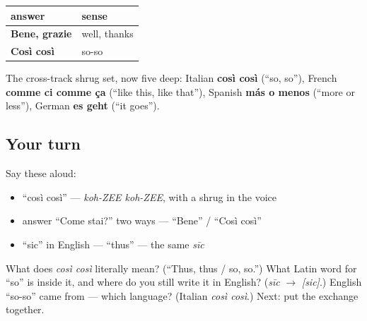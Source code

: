 \begin{grammarlens}[title={Grammar Lens: your answer ladder for \emph{Come stai?}}]
\noindent
\begin{tabularx}{\linewidth}{@{}>{\raggedright\arraybackslash}X>{\raggedright\arraybackslash}X@{}}
\toprule
\textbf{answer} & \textbf{sense} \\
\midrule
\textbf{Bene, grazie} & well, thanks \\
\textbf{Così così} & so-so \\
\bottomrule
\end{tabularx}

The cross-track shrug set, now five deep: Italian \textbf{così così} (\textquotedblleft{}so, so\textquotedblright{}), French \textbf{comme ci comme ça} (\textquotedblleft{}like this, like that\textquotedblright{}), Spanish \textbf{más o menos} (\textquotedblleft{}more or less\textquotedblright{}), German \textbf{es geht} (\textquotedblleft{}it goes\textquotedblright{}).
\end{grammarlens}

\subsection*{Your turn}
Say these aloud:

\begin{itemize}
\raggedright
  \item \textquotedblleft{}così così\textquotedblright{} — \emph{koh-ZEE koh-ZEE}, with a shrug in the voice
  \item answer \textquotedblleft{}Come stai?\textquotedblright{} two ways — \textquotedblleft{}Bene\textquotedblright{} / \textquotedblleft{}Così così\textquotedblright{}
  \item \textquotedblleft{}sic\textquotedblright{} in English — \textquotedblleft{}thus\textquotedblright{} — the same \emph{sīc}
\end{itemize}

\begin{tcolorbox}[breakable,colback=teal!4,colframe=teal!35!black,title={Before you move on}]
What does \emph{così così} literally mean? (\textquotedblleft{}Thus, thus / so, so.\textquotedblright{}) What Latin word for \textquotedblleft{}so\textquotedblright{} is inside it, and where do you still write it in English? (\emph{sīc} $\to$ \emph{{[}sic{]}}.) English \textquotedblleft{}so-so\textquotedblright{} came from — which language? (Italian \emph{così così}.) Next: put the exchange together.
\end{tcolorbox}

